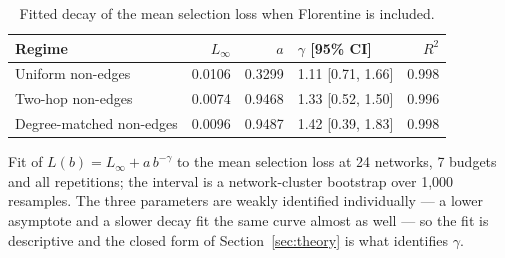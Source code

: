 \begin{table}[htbp]
\centering
\scriptsize
\caption{Fitted decay of the mean selection loss when Florentine is included.}
\label{tab:decay24}
\begin{tabular}{l r r l r}
\toprule
Regime & $L_\infty$ & $a$ & $\gamma$ [95\% CI] & $R^2$ \\
\midrule
Uniform non-edges & 0.0106 & 0.3299 & 1.11 [0.71, 1.66] & 0.998 \\
Two-hop non-edges & 0.0074 & 0.9468 & 1.33 [0.52, 1.50] & 0.996 \\
Degree-matched non-edges & 0.0096 & 0.9487 & 1.42 [0.39, 1.83] & 0.998 \\
\bottomrule
\end{tabular}
\par\vspace{2pt}\begin{minipage}{\linewidth}\footnotesize Fit of $L(b) = L_\infty + a\,b^{-\gamma}$ to the mean selection loss at 24 networks, 7 budgets and all repetitions; the interval is a network-cluster bootstrap over 1{,}000 resamples. The three parameters are weakly identified individually --- a lower asymptote and a slower decay fit the same curve almost as well --- so the fit is descriptive and the closed form of Section~\ref{sec:theory} is what identifies $\gamma$.\end{minipage}
\end{table}
